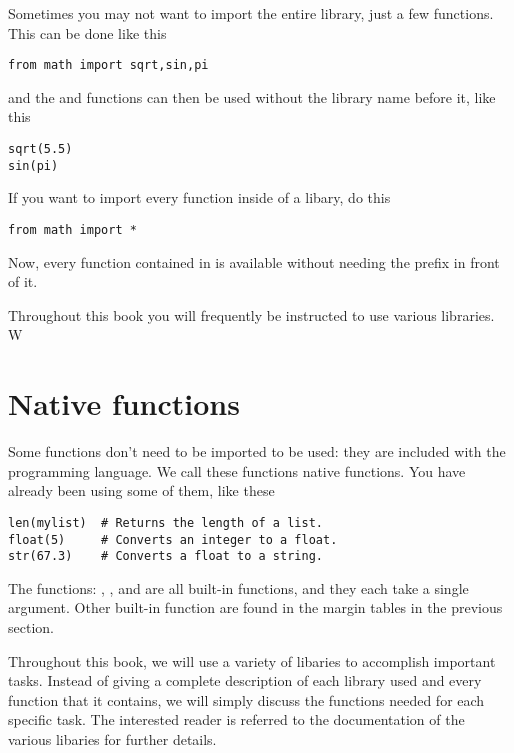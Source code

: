 Sometimes you may not want to import the entire library, just a few
functions. This can be done like this
\begin{Verbatim}
from math import sqrt,sin,pi
\end{Verbatim}
and the  and  functions can then be used
without the library name before it, like this
\begin{Verbatim}
sqrt(5.5)
sin(pi)
\end{Verbatim}
If you want to import every function inside of a libary, do this
\begin{Verbatim}
from math import *
\end{Verbatim}
Now, every function contained in  is available without
needing the  prefix in front of it. 


Throughout this book you will frequently be instructed to use various
libraries.  W
\section{Native functions}
Some functions don't need to be imported to be used: they are included with the
programming language.  We call these functions native
functions.  You have already been using some
of them, like these
\begin{Verbatim}
len(mylist)  # Returns the length of a list.
float(5)     # Converts an integer to a float.
str(67.3)    # Converts a float to a string.
\end{Verbatim}
The functions: , , and  are all
built-in functions, and they each take a single argument.  Other
built-in function are found in the margin tables in the previous section.


Throughout this book, we will use a variety of libaries to accomplish
important tasks.  Instead of giving a complete description of each
library used and every function that it contains, we will simply
discuss the functions needed for each specific task.  The interested
reader is referred to the documentation of the various libaries for
further details.



